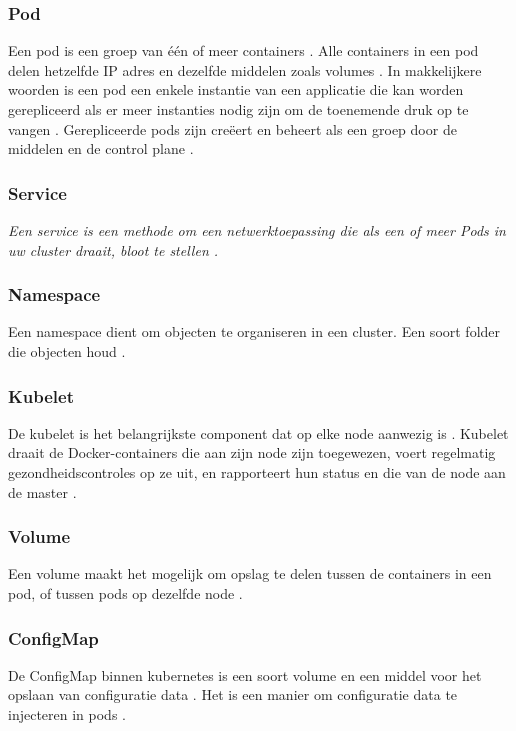 \subsubsection{Pod}
Een pod is een groep van één of meer containers \autocite{habbal-2020}.
Alle containers in een pod delen hetzelfde IP adres en dezelfde middelen zoals volumes \autocite{hohn-2020}.
In makkelijkere woorden is een pod een enkele instantie van een applicatie die kan worden gerepliceerd als er meer instanties nodig zijn om de toenemende druk op te vangen \autocite{habbal-2020}.
Gerepliceerde pods zijn creëert en beheert als een groep door de middelen en de control plane \textcite{KubernetesDocs-2023}.

\subsubsection{Service}
\textit{Een service is een methode om een netwerktoepassing die als een of meer Pods in uw cluster draait, bloot te stellen \autocite{KubernetesDocs-2023}.}

\subsubsection{Namespace}
Een namespace dient om objecten te organiseren in een cluster.
Een soort folder die objecten houd \autocite{burns-2022}.

\subsubsection{Kubelet}
De kubelet is het belangrijkste component dat op elke node aanwezig is \autocite{Vayghan2019}.
Kubelet draait de Docker-containers die aan zijn node zijn toegewezen, voert regelmatig gezondheidscontroles op ze uit, en rapporteert hun status en die van de node aan de master \autocite{Vayghan2019}.

\subsubsection{Volume}
Een volume maakt het mogelijk om opslag te delen tussen de containers in een pod, of tussen pods op dezelfde node \autocite{Baier2017}.

\subsubsection{ConfigMap}
De ConfigMap binnen kubernetes is een soort volume en een middel voor het opslaan van configuratie data \autocite{KubernetesDocs-2023}.
Het is een manier om configuratie data te injecteren in pods \autocite{KubernetesDocs-2023}.

